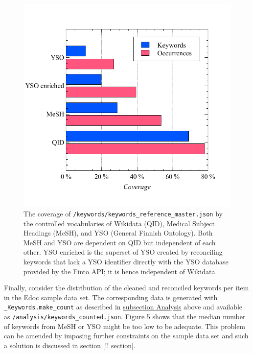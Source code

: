 \begin{figure}
\centering
\includegraphics{images/native_gold_standard.pdf}
\caption{The coverage of
\texttt{/keywords/keywords\_reference\_master.json} by the controlled
vocabularies of Wikidata (QID), Medical Subject Headings (MeSH), and YSO
(General Finnish Ontology). Both MeSH and YSO are dependent on QID but
independent of each other. YSO enriched is the superset of YSO created
by reconciling keywords that lack a YSO identifier directly with the YSO
database provided by the Finto API; it is hence independent of
Wikidata.}
\end{figure}

Finally, consider the distribution of the cleaned and reconciled
keywords per item in the Edoc sample data set. The corresponding data is
generated with \texttt{\_Keywords.make\_count} as described in
\protect\hyperlink{analysis}{subsection Analysis} above and available as
\texttt{/analysis/keywords\_counted.json}. Figure 5 shows that the
median number of keywords from MeSH or YSO might be too low to be
adequate. This problem can be amended by imposing further constraints on
the sample data set and such a solution is discussed in section {[}!!
section{]}.

